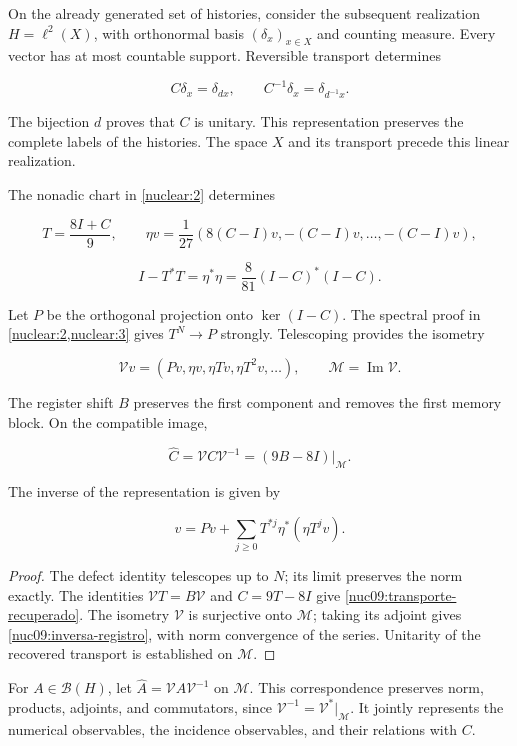 On the already generated set of histories, consider the subsequent realization \(H=\ell^2(X)\), with orthonormal basis \((\delta_x)_{x\in X}\) and counting measure. Every vector has at most countable support. Reversible transport determines

\[
C\delta_x=\delta_{d x},\qquad C^{-1}\delta_x=\delta_{d^{-1}x}.
\]

The bijection \(d\) proves that \(C\) is unitary. This representation preserves the complete labels of the histories. The space \(X\) and its transport precede this linear realization.

The nonadic chart in \cref{nuclear:2} determines

\[
T=\frac{8I+C}{9},\qquad
\eta v=\frac1{27}(8(C-I)v,-(C-I)v,\ldots,-(C-I)v),
\]

\[
I-T^*T=\eta^*\eta=\frac8{81}(I-C)^*(I-C).
\]

Let \(P\) be the orthogonal projection onto \(\ker(I-C)\). The spectral proof in \cref{nuclear:2,nuclear:3} gives \(T^N\to P\) strongly. Telescoping provides the isometry

\[
\mathcal Vv=(Pv,\eta v,\eta Tv,\eta T^2v,\ldots),\qquad
\mathcal M=\operatorname{Im}\mathcal V.
\]

The register shift \(B\) preserves the first component and removes the first memory block. On the compatible image,

\begin{equation}
\boxed{\widehat C=\mathcal VC\mathcal V^{-1}
=(9B-8I)|_{\mathcal M}.}
\label{nuc09:transporte-recuperado}
\end{equation}

The inverse of the representation is given by

\begin{equation}
v=Pv+\sum_{j\ge0}T^{*j}\eta^*(\eta T^jv).
\label{nuc09:inversa-registro}
\end{equation}

\begin{proof}
The defect identity telescopes up to \(N\); its limit preserves the norm exactly. The identities \(\mathcal VT=B\mathcal V\) and \(C=9T-8I\) give \eqref{nuc09:transporte-recuperado}. The isometry \(\mathcal V\) is surjective onto \(\mathcal M\); taking its adjoint gives \eqref{nuc09:inversa-registro}, with norm convergence of the series. Unitarity of the recovered transport is established on \(\mathcal M\).
\end{proof}

For \(A\in\mathcal B(H)\), let \(\widehat A=\mathcal VA\mathcal V^{-1}\) on \(\mathcal M\). This correspondence preserves norm, products, adjoints, and commutators, since \(\mathcal V^{-1}=\mathcal V^*|_{\mathcal M}\). It jointly represents the numerical observables, the incidence observables, and their relations with \(C\).

